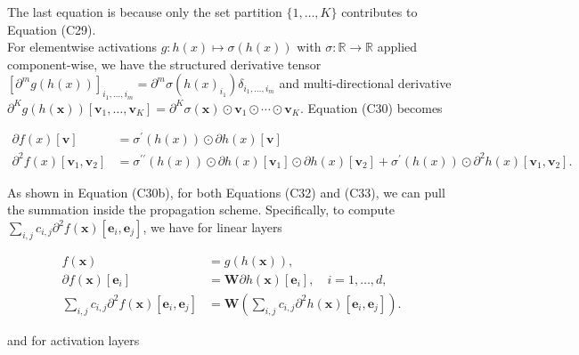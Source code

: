 \documentclass[10pt]{article}
\begin{document}
The last equation is because only the set partition $\{1, \ldots, K\}$ contributes to Equation (C29).\\
For elementwise activations $g: h(x) \mapsto \sigma(h(x))$ with $\sigma: \mathbb{R} \rightarrow \mathbb{R}$ applied component-wise, we have the structured derivative tensor $\left[\partial^{m} g(h(x))\right]_{i_{1}, \ldots, i_{m}}=\partial^{m} \sigma\left(h(x)_{i_{1}}\right) \delta_{i_{1}, \ldots, i_{m}}$ and multi-directional derivative $\partial^{K} g(h(\boldsymbol{x}))\left[\boldsymbol{v}_{1}, \ldots, \boldsymbol{v}_{K}\right]=\partial^{K} \sigma(\boldsymbol{x}) \odot \boldsymbol{v}_{1} \odot \cdots \odot \boldsymbol{v}_{K}$. Equation (C30) becomes


\begin{align*}
\partial f(x)[\boldsymbol{v}] & =\sigma^{\prime}(h(x)) \odot \partial h(x)[\boldsymbol{v}]  \tag{C33a}\\
\partial^{2} f(x)\left[\boldsymbol{v}_{1}, \boldsymbol{v}_{2}\right] & =\sigma^{\prime \prime}(h(x)) \odot \partial h(x)\left[\boldsymbol{v}_{1}\right] \odot \partial h(x)\left[\boldsymbol{v}_{2}\right]+\sigma^{\prime}(h(x)) \odot \partial^{2} h(x)\left[\boldsymbol{v}_{1}, \boldsymbol{v}_{2}\right] . \tag{C33b}
\end{align*}


As shown in Equation (C30b), for both Equations (C32) and (C33), we can pull the summation inside the propagation scheme. Specifically, to compute $\sum_{i, j} c_{i, j} \partial^{2} f(\boldsymbol{x})\left[\boldsymbol{e}_{i}, \boldsymbol{e}_{j}\right]$, we have for linear layers


\begin{align*}
f(\boldsymbol{x}) & =g(h(\boldsymbol{x})),  \tag{C34a}\\
\partial f(\boldsymbol{x})\left[\boldsymbol{e}_{i}\right] & =\boldsymbol{W} \partial h(\boldsymbol{x})\left[\boldsymbol{e}_{i}\right], \quad i=1, \ldots, d,  \tag{C34b}\\
\sum_{i, j} c_{i, j} \partial^{2} f(\boldsymbol{x})\left[\boldsymbol{e}_{i}, \boldsymbol{e}_{j}\right] & =\boldsymbol{W}\left(\sum_{i, j} c_{i, j} \partial^{2} h(\boldsymbol{x})\left[\boldsymbol{e}_{i}, \boldsymbol{e}_{j}\right]\right) . \tag{C34c}
\end{align*}


and for activation layers
\end{document}
